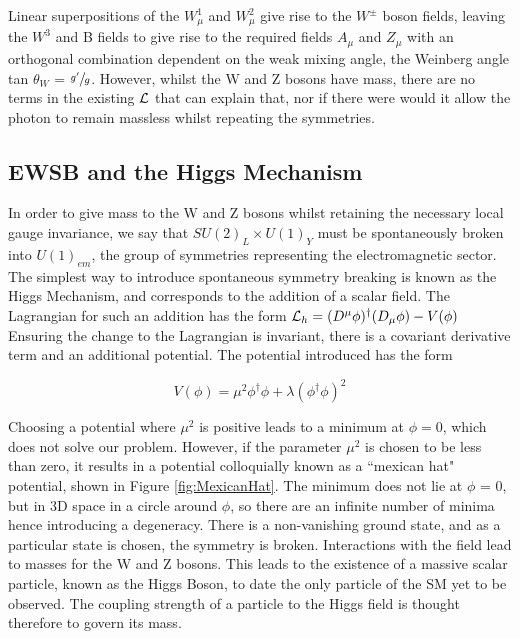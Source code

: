 Linear superpositions of the $W^{1}_{\mu}$ and $W^{2}_{\mu}$ give rise to the $W^{\pm}$ boson fields, leaving the $W^{3}$ and B fields to give rise to the required fields $A_{\mu}$ and $Z_{\mu}$ with an orthogonal combination dependent on the weak mixing angle, the Weinberg angle tan $\theta_{W}$ = $\sfrac{g'}{g}$. However, whilst the W and Z bosons have mass, there are no terms in the existing ${\mathcal{L}}$ that can explain that, nor if there were would it allow the photon to remain massless whilst repeating the symmetries. 

\subsection{EWSB and the Higgs Mechanism}

In order to give mass to the W and Z bosons whilst retaining the necessary local gauge invariance, we say that $SU(2)_{L} \times U(1)_{Y}$ must be spontaneously broken into $U(1)_{em}$, the group of symmetries representing the electromagnetic sector. The simplest way to introduce spontaneous symmetry breaking is known as the Higgs Mechanism, and corresponds to the addition of a scalar field. The Lagrangian for such an addition has the form ${\mathcal{L}}_{h} = (D^{\mu}\phi)^{\dagger}(D_{\mu}\phi) - V(\phi)$  Ensuring the change to the Lagrangian is invariant, there is a covariant derivative term and an additional potential. The potential introduced has the form 

\begin{equation}
V(\phi) = \mu^{2}\phi^{\dagger}\phi + \lambda (\phi^{\dagger}\phi)^{2}
\end{equation}

Choosing a potential where $\mu^{2}$ is positive leads to a minimum at $\phi = 0$, which does not solve our problem. However, if the parameter $\mu^{2}$ is chosen to be less than zero, it results in a potential colloquially known as a ``mexican hat" potential, shown in Figure \ref{fig:MexicanHat}. The minimum does not lie at $\phi$ = 0, but in 3D space in a circle around $\phi$, so there are an infinite number of minima hence introducing a degeneracy. There is a non-vanishing ground state, and as a particular state is chosen, the symmetry is broken. Interactions with the field lead to masses for the W and Z bosons. This leads to the existence of a massive scalar particle, known as the Higgs Boson, to date the only particle of the SM yet to be observed. The coupling strength of a particle to the Higgs field is thought therefore to govern its mass.

